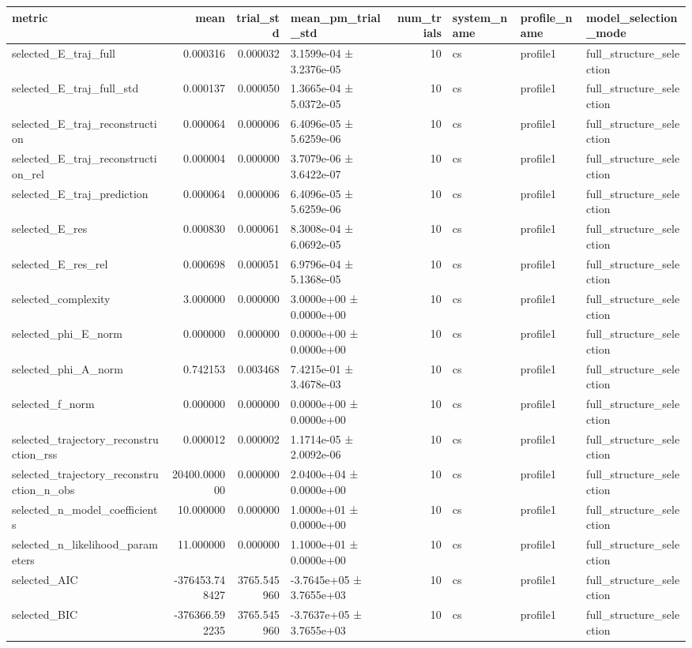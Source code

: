 \begin{tabular}{lrrlrlll}
\toprule
metric & mean & trial_std & mean_pm_trial_std & num_trials & system_name & profile_name & model_selection_mode \\
\midrule
selected_E_traj_full & 0.000316 & 0.000032 & 3.1599e-04 ± 3.2376e-05 & 10 & cs & profile1 & full_structure_selection \\
selected_E_traj_full_std & 0.000137 & 0.000050 & 1.3665e-04 ± 5.0372e-05 & 10 & cs & profile1 & full_structure_selection \\
selected_E_traj_reconstruction & 0.000064 & 0.000006 & 6.4096e-05 ± 5.6259e-06 & 10 & cs & profile1 & full_structure_selection \\
selected_E_traj_reconstruction_rel & 0.000004 & 0.000000 & 3.7079e-06 ± 3.6422e-07 & 10 & cs & profile1 & full_structure_selection \\
selected_E_traj_prediction & 0.000064 & 0.000006 & 6.4096e-05 ± 5.6259e-06 & 10 & cs & profile1 & full_structure_selection \\
selected_E_res & 0.000830 & 0.000061 & 8.3008e-04 ± 6.0692e-05 & 10 & cs & profile1 & full_structure_selection \\
selected_E_res_rel & 0.000698 & 0.000051 & 6.9796e-04 ± 5.1368e-05 & 10 & cs & profile1 & full_structure_selection \\
selected_complexity & 3.000000 & 0.000000 & 3.0000e+00 ± 0.0000e+00 & 10 & cs & profile1 & full_structure_selection \\
selected_phi_E_norm & 0.000000 & 0.000000 & 0.0000e+00 ± 0.0000e+00 & 10 & cs & profile1 & full_structure_selection \\
selected_phi_A_norm & 0.742153 & 0.003468 & 7.4215e-01 ± 3.4678e-03 & 10 & cs & profile1 & full_structure_selection \\
selected_f_norm & 0.000000 & 0.000000 & 0.0000e+00 ± 0.0000e+00 & 10 & cs & profile1 & full_structure_selection \\
selected_trajectory_reconstruction_rss & 0.000012 & 0.000002 & 1.1714e-05 ± 2.0092e-06 & 10 & cs & profile1 & full_structure_selection \\
selected_trajectory_reconstruction_n_obs & 20400.000000 & 0.000000 & 2.0400e+04 ± 0.0000e+00 & 10 & cs & profile1 & full_structure_selection \\
selected_n_model_coefficients & 10.000000 & 0.000000 & 1.0000e+01 ± 0.0000e+00 & 10 & cs & profile1 & full_structure_selection \\
selected_n_likelihood_parameters & 11.000000 & 0.000000 & 1.1000e+01 ± 0.0000e+00 & 10 & cs & profile1 & full_structure_selection \\
selected_AIC & -376453.748427 & 3765.545960 & -3.7645e+05 ± 3.7655e+03 & 10 & cs & profile1 & full_structure_selection \\
selected_BIC & -376366.592235 & 3765.545960 & -3.7637e+05 ± 3.7655e+03 & 10 & cs & profile1 & full_structure_selection \\
\bottomrule
\end{tabular}

